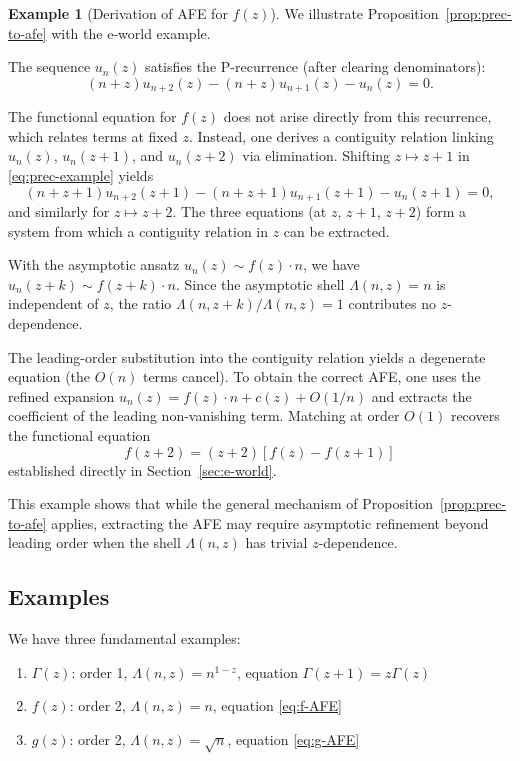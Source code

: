 \documentclass[11pt,reqno]{amsart}
\theoremstyle{definition}
\newtheorem{example}[theorem]{Example}
\newcommand{\ee}{\mathrm{e}}
\numberwithin{equation}{section}
\begin{document}
\begin{example}[Derivation of AFE for $f(z)$]\label{ex:afe-derivation}
We illustrate Proposition~\ref{prop:prec-to-afe} with the $\ee$-world example.

The sequence $u_n(z)$ satisfies the P-recurrence (after clearing denominators):
\begin{equation}\label{eq:prec-example}
(n+z)u_{n+2}(z) - (n+z)u_{n+1}(z) - u_n(z) = 0.
\end{equation}

The functional equation for $f(z)$ does not arise directly from this recurrence, which relates terms at fixed $z$. Instead, one derives a contiguity relation linking $u_n(z)$, $u_n(z+1)$, and $u_n(z+2)$ via elimination. Shifting $z \mapsto z+1$ in \eqref{eq:prec-example} yields
$$
(n+z+1)u_{n+2}(z+1) - (n+z+1)u_{n+1}(z+1) - u_n(z+1) = 0,
$$
and similarly for $z \mapsto z+2$. The three equations (at $z$, $z+1$, $z+2$) form a system from which a contiguity relation in $z$ can be extracted.

With the asymptotic ansatz $u_n(z) \sim f(z) \cdot n$, we have $u_n(z+k) \sim f(z+k) \cdot n$. Since the asymptotic shell $\Lambda(n,z) = n$ is independent of $z$, the ratio $\Lambda(n,z+k)/\Lambda(n,z) = 1$ contributes no $z$-dependence.

The leading-order substitution into the contiguity relation yields a degenerate equation (the $O(n)$ terms cancel). To obtain the correct AFE, one uses the refined expansion $u_n(z) = f(z) \cdot n + c(z) + O(1/n)$ and extracts the coefficient of the leading non-vanishing term. Matching at order $O(1)$ recovers the functional equation
$$f(z+2) = (z+2)[f(z) - f(z+1)]$$
established directly in Section~\ref{sec:e-world}.

This example shows that while the general mechanism of Proposition~\ref{prop:prec-to-afe} applies, extracting the AFE may require asymptotic refinement beyond leading order when the shell $\Lambda(n,z)$ has trivial $z$-dependence.
\end{example}

\subsection{Examples}

We have three fundamental examples:
\begin{enumerate}
\item $\Gamma(z)$: order 1, $\Lambda(n,z)=n^{1-z}$, equation $\Gamma(z+1)=z\Gamma(z)$
\item $f(z)$: order 2, $\Lambda(n,z)=n$, equation \eqref{eq:f-AFE}
\item $g(z)$: order 2, $\Lambda(n,z)=\sqrt{n}$, equation \eqref{eq:g-AFE}
\end{enumerate}
\end{document}
